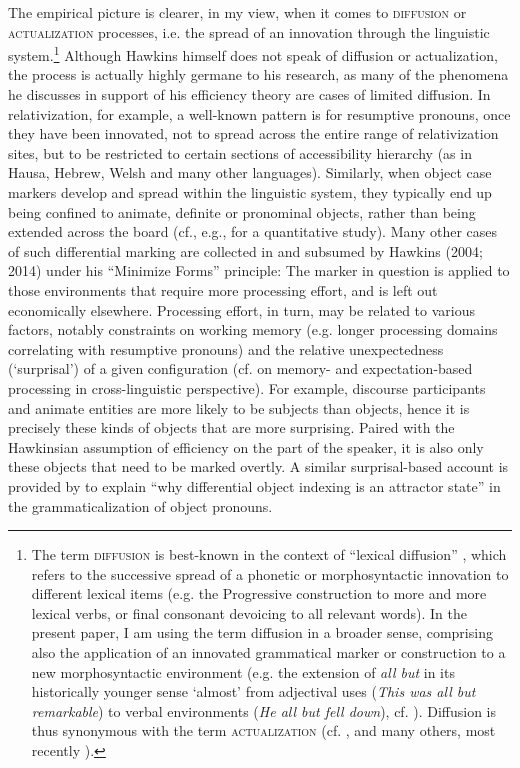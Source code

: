 \documentclass[output=paper]{langsci/langscibook}
\begin{document}
The empirical picture is clearer, in my view, when it comes to \textsc{diffusion} or \textsc{actualization} processes, i.e. the spread of an innovation through the linguistic system.\footnote{The term \textsc{diffusion} is best-known in the context of “lexical diffusion” \citep{Wang1969}, which refers to the successive spread of a phonetic or morphosyntactic innovation to different lexical items (e.g. the Progressive construction to more and more lexical verbs, or final consonant devoicing to all relevant words). In the present paper, I am using the term diffusion in a broader sense, comprising also the application of an innovated grammatical marker or construction to a new morphosyntactic environment (e.g. the extension of \textit{all but} in its historically younger sense ‘almost’ from adjectival uses (\textit{This was all but remarkable}) to verbal environments (\textit{He all but fell down}), cf.  \citealt{DeSmet2012}). Diffusion is thus synonymous with the term \textsc{actualization} (cf. \citealt{Timberlake1977}, \citealt{Andersen2001} and many others, most recently  \citealt{DeSmet2012}).} Although Hawkins himself does not speak of diffusion or actualization, the process is actually highly germane to his research, as many of the phenomena he discusses in support of his efficiency theory are cases of limited diffusion. In relativization, for example, a well-known pattern is for resumptive pronouns, once they have been innovated, not to spread across the entire range of relativization sites, but to be restricted to certain sections of  accessibility hierarchy (as in Hausa, Hebrew, Welsh and many other languages). Similarly, when object case markers develop and spread within the linguistic system, they typically end up being confined to animate, definite or pronominal objects, rather than being extended across the board (cf., e.g., \citealt{Sinnemäki2014} for a quantitative study). Many other cases of such differential marking are collected in \citet{Haspelmath2008_Econ} and subsumed by Hawkins (2004; 2014) under his “Minimize Forms” principle: The marker in question is applied to those environments that require more processing effort, and is left out economically elsewhere. Processing effort, in turn, may be related to various factors, notably constraints on working memory (e.g. longer processing domains correlating with resumptive pronouns) and the relative unexpectedness (‘surprisal’) of a given configuration (cf. \citealt{NorcliffeEtAl2015} on memory- and expectation-based processing in cross-linguistic perspective). For example, discourse participants and animate entities are more likely to be subjects than objects, hence it is precisely these kinds of objects that are more surprising. Paired with the Hawkinsian assumption of efficiency on the part of the speaker, it is also only these objects that need to be marked overtly. A similar surprisal-based account is provided by \citet{Haig2018} to explain “why differential object indexing is an attractor state” \citep[781]{Haig2018} in the grammaticalization of object pronouns.
\end{document}
